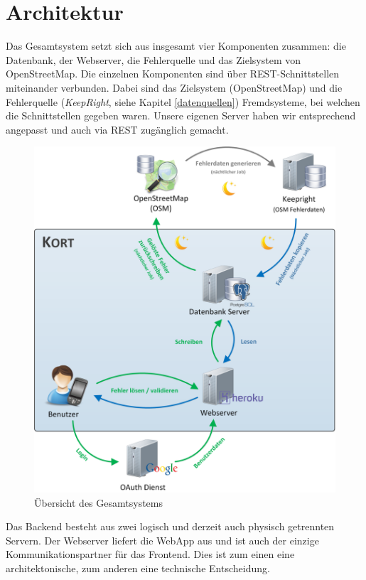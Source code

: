 \chapter{Architektur}
\label{architektur}

Das Gesamtsystem setzt sich aus insgesamt vier Komponenten zusammen: die Datenbank, der Webserver, die Fehlerquelle und das Zielsystem von \gls{OpenStreetMap}. 
Die einzelnen Komponenten sind über \gls{REST}-Schnittstellen miteinander verbunden. 
Dabei sind das Zielsystem (\gls{OpenStreetMap}) und die Fehlerquelle (\emph{KeepRight}, siehe Kapitel \ref{datenquellen}) Fremdsysteme, bei welchen die Schnittstellen gegeben waren. 
Unsere eigenen Server haben wir entsprechend angepasst und auch via \gls{REST} zugänglich gemacht.

\begin{figure}[H]
	\centering
	\includegraphics[scale=0.32]{images/implementation/backend/kort-big_picture}
	\caption{Übersicht des Gesamtsystems}
	\label{image-kort-big-picture}
\end{figure}

Das Backend besteht aus zwei logisch und derzeit auch physisch getrennten Servern. 
Der Webserver liefert die \gls{WebApp} aus und ist auch der einzige Kommunikationspartner für das Frontend. Dies ist zum einen eine architektonische, zum anderen eine technische Entscheidung.

